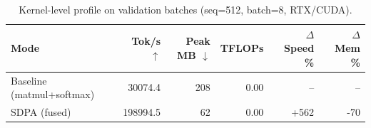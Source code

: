 
\begin{table}[ht]
  \centering
  \caption{Kernel-level profile on validation batches (seq=512, batch=8, RTX/CUDA).}
  \label{tab:profile}
  \begin{tabular}{lrrrrr}
    \toprule
    Mode & Tok/s $\uparrow$ & Peak MB $\downarrow$ & TFLOPs & $\Delta$ Speed \% & $\Delta$ Mem \% \\
    \midrule
    Baseline (matmul+softmax) & 30074.4 & 208 & 0.00 & – & – \\
    SDPA (fused) & 198994.5 & 62 & 0.00 & +562 & -70 \\
    \bottomrule
  \end{tabular}
\end{table}
